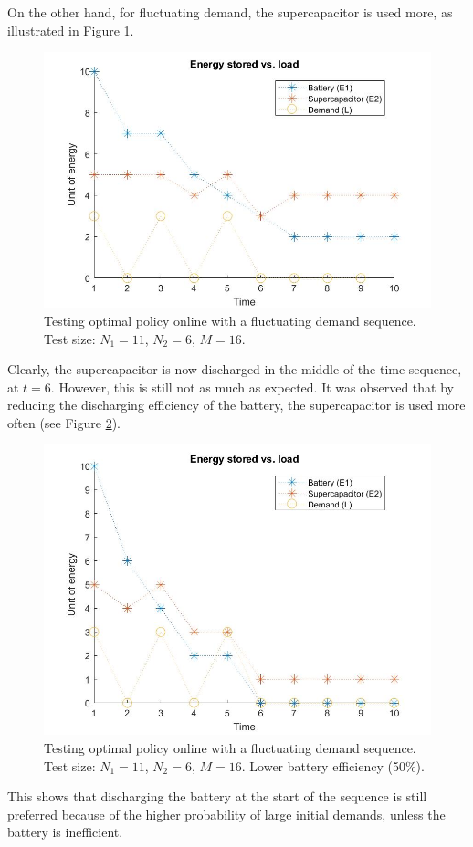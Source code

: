 \documentclass[conference]{IEEEtran}
\begin{document}
On the other hand, for fluctuating demand, the supercapacitor is used more, as illustrated in Figure \ref{fig:FluctuatingDemand}.
\begin{figure}[htbp]
\centerline{\includegraphics[scale=0.25]{EnergyStoredvsFluctuatingLoad(E1=10,E2=5).jpg}}
\caption{Testing optimal policy online with a fluctuating demand sequence. Test size: $N_{1}=11$, $N_{2}=6$, $M=16$.}
\label{fig:FluctuatingDemand}
\end{figure} Clearly, the supercapacitor is now discharged in the middle of the time sequence, at $t=6$. However, this is still not as much as expected. It was observed that by reducing the discharging efficiency of the battery, the supercapacitor is used more often (see Figure \ref{fig:FluctuatingDemand_LowBattEff}).
\begin{figure}[tbp]
\centerline{\includegraphics[scale=0.25]{EnergyStoredvsFluctuatingLoad_LowBattEff(E1=10,E2=5).jpg}}
\caption{Testing optimal policy online with a fluctuating demand sequence. Test size: $N_{1}=11$, $N_{2}=6$, $M=16$. Lower battery efficiency (50\%).}
\label{fig:FluctuatingDemand_LowBattEff}
\end{figure} This shows that discharging the battery at the start of the sequence is still preferred because of the higher probability of large initial demands, unless the battery is inefficient.
\end{document}
